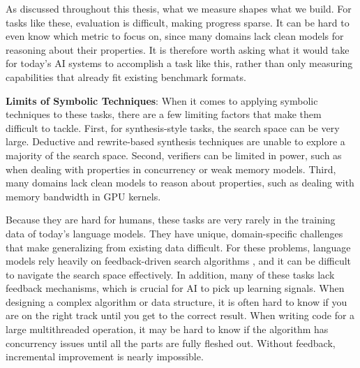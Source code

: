 As discussed throughout this thesis, what we measure shapes what we build. For tasks like these, evaluation is difficult, making progress sparse. It can be hard to even know which metric to focus on, since many domains lack clean models for reasoning about their properties. It is therefore worth asking what it would take for today's AI systems to accomplish a task like this, rather than only measuring capabilities that already fit existing benchmark formats.

\textbf{Limits of Symbolic Techniques}: When it comes to applying symbolic techniques to these tasks, there are a few limiting factors that make them difficult to tackle. First, for synthesis-style tasks, the search space can be very large. Deductive and rewrite-based synthesis techniques are unable to explore a majority of the search space. Second, verifiers can be limited in power, such as when dealing with properties in concurrency or weak memory models. Third, many domains lack clean models to reason about properties, such as dealing with memory bandwidth in GPU kernels. 

Because they are hard for humans, these tasks are very rarely in the training data of today's language models. They have unique, domain-specific challenges that make generalizing from existing data difficult. For these problems, language models rely heavily on feedback-driven search algorithms \citep{mankowitz2023faster}, and it can be difficult to navigate the search space effectively. In addition, many of these tasks lack feedback mechanisms, which is crucial for AI to pick up learning signals. When designing a complex algorithm or data structure, it is often hard to know if you are on the right track until you get to the correct result. When writing code for a large multithreaded operation, it may be hard to know if the algorithm has concurrency issues until all the parts are fully fleshed out. Without feedback, incremental improvement is nearly impossible.
